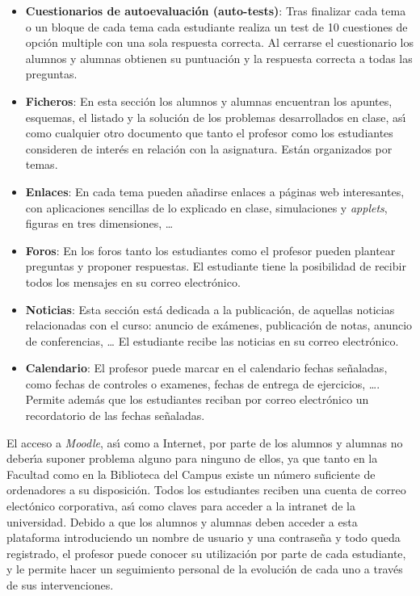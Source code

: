 \begin{itemize} 
\item {\bf  Cuestionarios de autoevaluaci\'{o}n (auto-tests)}: Tras finalizar cada tema o un bloque de cada tema cada  estudiante realiza un test de 10 cuestiones
 de opci\'{o}n multiple con una sola respuesta correcta.
 Al cerrarse el cuestionario los alumnos y alumnas
 obtienen su puntuaci\'{o}n y la respuesta correcta a todas las preguntas.

\item {\bf  Ficheros}: En esta secci\'{o}n los alumnos y alumnas 
encuentran los apuntes,
esquemas, el listado y la soluci\'{o}n de los problemas desarrollados en clase,
 as\'{\i} como cualquier otro documento que tanto el profesor como los estudiantes
consideren de inter\'{e}s en relaci\'{o}n con la asignatura.
Est\'{a}n organizados por temas. 
\item {\bf  Enlaces}: En cada tema pueden a\~{n}adirse enlaces a p\'{a}ginas web
interesantes, con aplicaciones sencillas de lo explicado en clase, simulaciones
y  {\it applets}, figuras en tres dimensiones, \ldots
\item {\bf Foros}: En los foros
 tanto los estudiantes como el profesor pueden 
plantear preguntas y proponer respuestas.
El estudiante tiene la posibilidad de recibir todos los mensajes en su correo
electr\'{o}nico.
\item{ \bf Noticias}: Esta secci\'{o}n est\'{a} dedicada a la publicaci\'{o}n,
de aquellas noticias relacionadas con el curso: anuncio de ex\'{a}menes,
 publicaci\'{o}n de notas, anuncio de conferencias, \ldots
El estudiante  recibe las noticias en su correo
electr\'{o}nico.
\item{\bf Calendario}: El profesor puede marcar en el calendario fechas
 se\~{n}aladas, como fechas de controles o examenes, fechas de entrega de 
ejercicios, \ldots. Permite adem\'{a}s que los estudiantes reciban por 
correo electr\'{o}nico un recordatorio de las fechas se\~{n}aladas.
\end{itemize}

El acceso a {\it Moodle}, as\'{\i} como a Internet, por parte de los alumnos y alumnas
no deber\'{\i}a suponer  problema alguno para ninguno de ellos,
ya que tanto en la Facultad como en la Biblioteca del Campus existe un
n\'{u}mero suficiente de ordenadores a su disposici\'{o}n. Todos los estudiantes
reciben una cuenta de correo elect\'{o}nico corporativa, as\'{\i} como 
claves para acceder a la intranet de la universidad. 
Debido a que los alumnos y alumnas deben acceder a esta plataforma introduciendo
 un nombre de usuario y una contrase\~{n}a y todo queda registrado,
  el profesor puede conocer su utilizaci\'{o}n por parte de cada
 estudiante, y le permite hacer un seguimiento personal de la evoluci\'{o}n 
de cada uno a trav\'{e}s de sus intervenciones.


